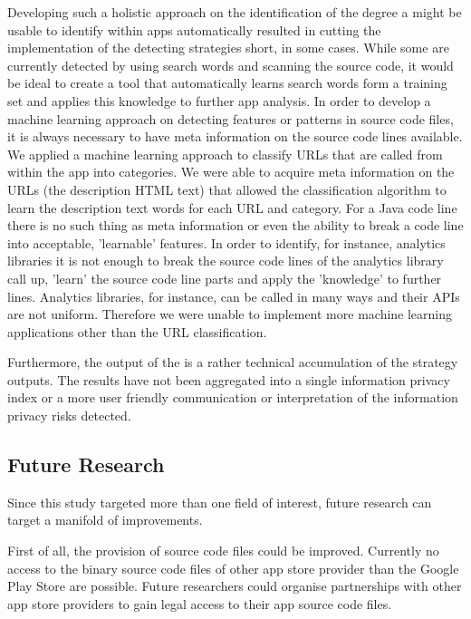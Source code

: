 Developing such a holistic approach on the identification of the degree a \sca might be usable to identify \ipr within \mH apps automatically resulted in cutting the implementation of the \ipr detecting strategies short, in some cases.
While some \ipr are currently detected by using search words and scanning the source code, it would be ideal to create a tool that automatically learns search words form a training set and applies this knowledge to further app analysis.
In order to develop a machine learning approach on detecting features or patterns in source code files, it is always necessary to have meta information on the source code lines available.
We applied a machine learning approach to classify URLs that are called from within the app into categories. 
We were able to acquire meta information on the URLs (the description HTML text) that allowed the classification algorithm to learn the description text words for each URL and category.
For a Java code line there is no such thing as meta information or even the ability to break a code line into acceptable, 'learnable' features.
In order to identify, for instance, analytics libraries it is not enough to break the source code lines of the analytics library call up, 'learn' the source code line parts and apply the 'knowledge' to further lines.
Analytics libraries, for instance, can be called in many ways and their \acs{API}s are not uniform.
Therefore we were unable to implement more machine learning applications other than the URL classification.

Furthermore, the output of the \aiprat is a rather technical accumulation of the \sca strategy outputs.
The results have not been aggregated into a single information privacy index or a more user friendly communication or interpretation of the information privacy risks detected.

\subsection{Future Research}

Since this study targeted more than one field of interest, future research can target a manifold of improvements.

First of all, the provision of source code files could be improved. 
Currently no access to the binary source code files of other app store provider than the Google Play Store are possible.
Future researchers could organise partnerships with other app store providers to gain legal access to their app source code files.

